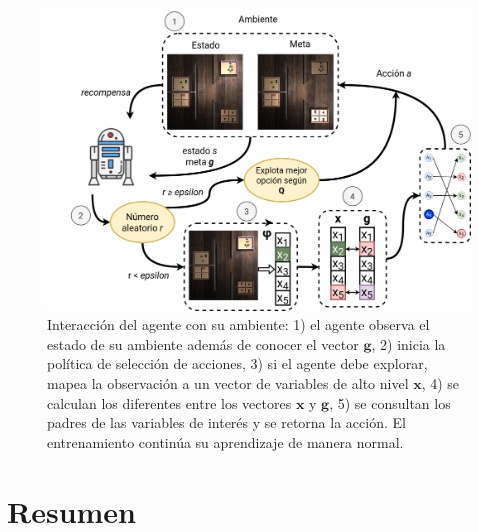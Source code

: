  \begin{figure}
     \centering
     \includegraphics[scale=0.25]{Chapter4/Figs/example_method.png}
     \caption{Interacción del agente con su ambiente: 1) el agente observa el estado de su ambiente además de conocer el vector $\mathbf{g}$, 2) inicia
     la política de selección de acciones, 3) si el agente debe explorar, mapea la observación a un vector de variables de alto nivel $\mathbf{x}$, 4) se calculan los diferentes entre los vectores $\mathbf{x}$ y $\mathbf{g}$, 5) se consultan los padres de las variables de interés y se retorna la acción. El entrenamiento continúa su aprendizaje de manera normal.}
     \label{fig:example-switches}
 \end{figure}
 
 \section{Resumen}
 
 

